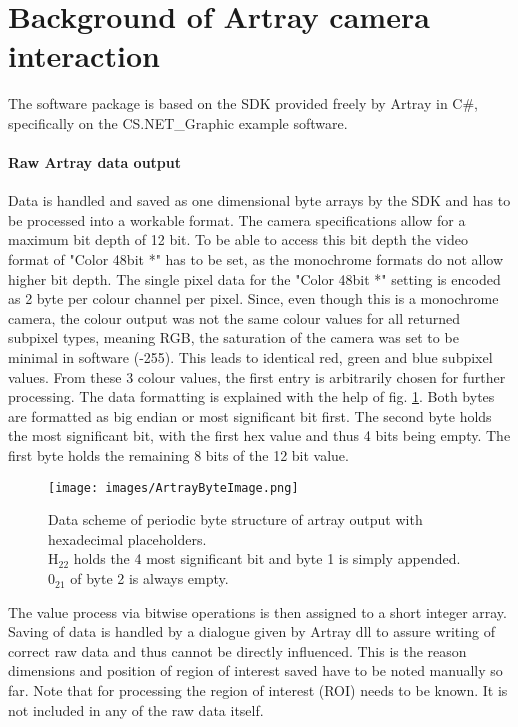 \documentclass[10pt,a4paper]{report}
\begin{document}
\section{Background of Artray camera interaction}
The software package is based on the SDK provided freely by Artray in C\#, specifically on the CS.NET\_Graphic example software. 

\paragraph{Raw Artray data output}\label{sec:artrayRawOutput}
Data is handled and saved as one dimensional byte arrays by the SDK and has to be processed into a workable format.  The camera specifications allow for a maximum bit depth of 12 bit. To be able to access this bit depth the video format of "Color 48bit *" has to be set, as the monochrome formats do not allow higher bit depth. The single pixel data for the "Color 48bit *" setting is encoded as 2 byte per colour channel per pixel. Since, even though this is a monochrome camera, the colour output was not the same colour values for all returned subpixel types, meaning RGB, the saturation of the camera was set to be minimal in software (-255). This leads to identical red, green and blue subpixel values. From these 3 colour values, the first entry is arbitrarily chosen for further processing.
The data formatting is explained with the help of fig. \ref{fig:ByteArtrayOut}. Both bytes are formatted as big endian or most significant bit first. The second byte holds the most significant bit, with the first hex value and thus 4 bits being empty. The first byte holds the remaining 8 bits of the 12 bit value.

\begin{figure}[hbtp]
\centering
\texttt{[image: images/ArtrayByteImage.png]}
\caption{Data scheme of periodic byte structure of artray output with hexadecimal placeholders.\\
$\mathrm{H_{22}}$ holds the 4 most significant bit and byte 1 is simply appended.\\
$\mathrm{0_{21}}$ of byte 2 is always empty.\label{fig:ByteArtrayOut}}
\end{figure}

The value process via bitwise operations is then assigned to a short integer array. Saving of data is handled by a dialogue given by Artray dll to assure writing of correct raw data and thus cannot be directly influenced. This is the reason dimensions and position of region of interest saved have to be noted manually so far. Note that for processing the region of interest (ROI) needs to be known. It is not included in any of the raw data itself.
\end{document}
